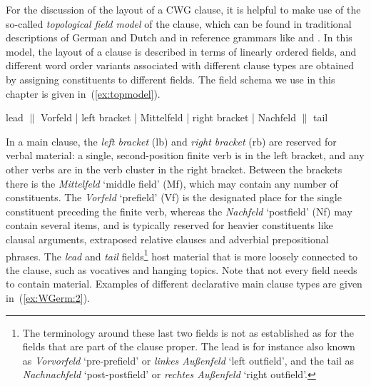 \documentclass[output=paper,hidelinks]{langscibook}
\begin{document}
For the discussion of the layout of a CWG clause, it is helpful to
make use of the so-called \textit{topological field model} of the
clause, which can be found in traditional descriptions of German and
Dutch and in reference grammars like
\citet{zifonun-etal:1997:vol7} and \citet{haeseryn-ed:1997}. In this model, the
layout of a clause is described in terms of linearly ordered fields,
and different word order variants associated with different clause
types are obtained by assigning constituents to different fields. The
field schema we use in this chapter is given in~(\ref{ex:topmodel}).
%
\begin{exe}
  \ex\label{ex:topmodel} lead $\|$ Vorfeld | left bracket | Mittelfeld | right bracket | Nachfeld  $\|$ tail
\end{exe}
%
\largerpage
In a main clause, the \textit{left bracket} (lb) and \textit{right
  bracket} (rb) are reserved for verbal material: a single,
second-position finite verb is in the left bracket, and any other
verbs are in the verb cluster in the right bracket. Between the
brackets there is the \textit{Mittelfeld} `middle field' (Mf), which
may contain any number of constituents. The \textit{Vorfeld}
`prefield' (Vf) is the designated place for the single constituent
preceding the finite verb, whereas the \textit{Nachfeld} `postfield'
(Nf) may contain several items, and is typically reserved for heavier
constituents like clausal arguments, extraposed relative clauses and
adverbial prepositional phrases. The \textit{lead} and
\textit{tail} fields\footnote{The terminology around these last two fields is
not as established as for the fields that are part of the clause
proper. The lead is for instance also known as \textit{Vorvorfeld}
`pre-prefield' or \textit{linkes Au{\ss}enfeld} `left outfield', and the
tail as \textit{Nachnachfeld} `post-postfield' or \textit{rechtes
  Au{\ss}enfeld} `right outfield'.} host material that is more loosely
connected to the clause, such as vocatives and hanging topics. Note
that not every field needs to contain material. Examples of different
declarative main clause types are given in~(\ref{ex:WGerm:2}).
\end{document}
